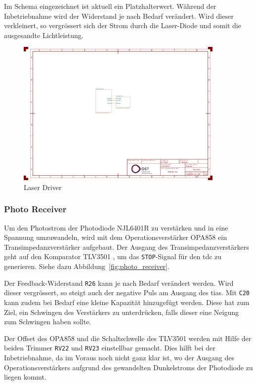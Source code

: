 Im Schema eingezeichnet ist aktuell ein Platzhalterwert. Während der Inbetriebnahme wird der Widerstand je nach Bedarf
verändert. Wird dieser verkleinert, so vergrössert sich der Strom durch die Laser-Diode und somit die ausgesandte
Lichtleistung.

\begin{figure}[H]
    \centering
    \includegraphics[page=3, trim=100 520 550 60, clip, width=0.9\textwidth]{attachments/schematic.pdf}
    \caption{Laser Driver}\label{fig:laser_driver}
\end{figure}

\subsubsection{Photo Receiver}\label{sec:schematic_photo_receiver}

Um den Photostrom der Photodiode NJL6401R \cite{jrc2014njl6401r3_datasheet} zu verstärken und in eine Spannung umzuwandeln,
wird mit dem Operationsverstärker OPA858 \cite{ti2018opa858_datasheet} ein Transimpedanzverstärker aufgebaut. Der
Ausgang des Transimpedanzverstärkers geht auf den Komparator TLV3501 \cite{ti2016tlv3501_datasheet}, um das \lstinline|STOP|-Signal
für den \acrshort{tdc} zu generieren. Siehe dazu Abbildung~\ref{fig:photo_receiver}.

Der Feedback-Widerstand \lstinline|R26| kann je nach Bedarf verändert werden. Wird dieser vergrössert, so steigt auch der
negative Puls am Ausgang des \acrshort{tia}s. Mit \lstinline|C20| kann zudem bei Bedarf eine kleine Kapazität hinzugefügt
werden. Diese hat zum Ziel, ein Schwingen des Verstärkers zu unterdrücken, falls dieser eine Neigung zum Schwingen haben
sollte.

Der Offset des OPA858 und die Schaltschwelle des TLV3501 werden mit Hilfe der beiden Trimmer \lstinline|RV22| und
\lstinline|RV23| einstellbar gemacht. Dies hilft bei der Inbetriebnahme, da im Voraus noch nicht ganz klar ist,
wo der Ausgang des Operationsverstärkers aufgrund des gewandelten Dunkelstroms der Photodiode zu liegen kommt.

